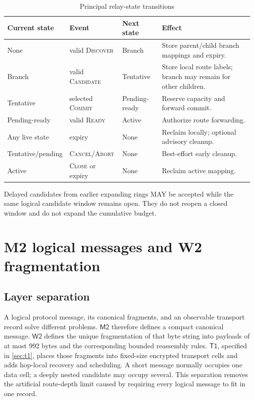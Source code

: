 \documentclass[11pt,oneside]{article}
\newcommand{\Mtwo}{\ensuremath{\mathsf{M2}}}
\newcommand{\Wtwo}{\ensuremath{\mathsf{W2}}}
\newcommand{\Tone}{\ensuremath{\mathsf{T1}}}
\begin{document}
\begin{table}[ht]
\centering
\caption{Principal relay-state transitions}
\label{tab:states}
\begin{tabularx}{\textwidth}{@{}p{}p{}p{}X@{}}
\toprule
Current state & Event & Next state & Effect \\
\midrule
None & valid \textsc{Discover} & Branch & Store parent/child branch mappings and expiry. \\
Branch & valid \textsc{Candidate} & Tentative & Store local route labels; branch may remain for other children. \\
Tentative & selected \textsc{Commit} & Pending-ready & Reserve capacity and forward commit. \\
Pending-ready & valid \textsc{Ready} & Active & Authorize route forwarding. \\
Any live state & expiry & None & Reclaim locally; optional advisory cleanup. \\
Tentative/pending & \textsc{Cancel}/\textsc{Abort} & None & Best-effort early cleanup. \\
Active & \textsc{Close} or expiry & None & Reclaim active mapping. \\
\bottomrule
\end{tabularx}
\end{table}

Delayed candidates from earlier expanding rings MAY be accepted while the same logical candidate window remains open. They do not reopen a closed window and do not expand the cumulative budget.

\section{M2 logical messages and W2 fragmentation}
\label{sec:messages}

\subsection{Layer separation}

A logical protocol message, its canonical fragments, and an observable transport record solve different problems. \Mtwo{} therefore defines a compact canonical message. \Wtwo{} defines the unique fragmentation of that byte string into payloads of at most 992 bytes and the corresponding bounded reassembly rules. \Tone{}, specified in \cref{sec:t1}, places those fragments into fixed-size encrypted transport cells and adds hop-local recovery and scheduling. A short message normally occupies one data cell; a deeply nested candidate may occupy several. This separation removes the artificial route-depth limit caused by requiring every logical message to fit in one record.
\end{document}
